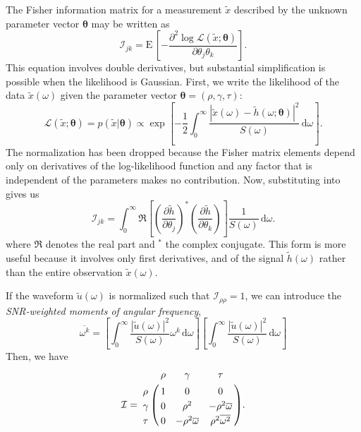 \documentclass{iopart}
\begin{document}
The Fisher information matrix for a measurement $\tilde x$ described by the unknown parameter vector $\boldsymbol{\theta}$ may be written as
%
\begin{equation}\label{eq:general-fisher-matrix}
	\mathcal{I}_{jk} = \mathrm{E} \, \left[
		-\frac{\partial^2 \log
			\mathcal{L}(\tilde x ; \boldsymbol\theta)}
			{\partial \theta_j \theta_k}
	\right].
\end{equation}
%
This equation involves double derivatives, but substantial simplification is possible when the likelihood is Gaussian. First, we write the likelihood of the data $\tilde x (\omega)$ given the parameter vector $\boldsymbol\theta = (\rho, \gamma, \tau)$:
%
\begin{equation}\label{eq:gaussian-likelihood}
	\mathcal{L}(\tilde x; \boldsymbol\theta) = p(\tilde x | \boldsymbol\theta)
		\propto \exp \left[
		- \frac{1}{2} \int_0^\infty \frac{\left|\tilde x (\omega)
			- \tilde h (\omega; \boldsymbol\theta) \right|^2}{S(\omega)} \, \mathrm{d}\omega
	\right].
\end{equation}
%
The normalization has been dropped because the Fisher matrix elements depend only on derivatives of the log\nobreakdashes-likelihood function and any factor that is independent of the parameters makes no contribution. Now, substituting  into  gives us
%
\begin{equation}\label{eq:gaussian-fisher-matrix}
	\mathcal{I}_{jk} = \int_0^\infty \Re \left[
        \left(\frac{\partial \tilde h}{\partial \theta_j}\right)^*
        \left(\frac{\partial \tilde h}{\partial \theta_k}\right)
	\right] \frac{1}{S(\omega)} \, \mathrm{d}\omega.
\end{equation}
%
where $\Re$ denotes the real part and $^*$ the complex conjugate. This form is more useful because it involves only first derivatives, and of the signal $\tilde h (\omega)$ rather than the entire observation $\tilde x (\omega)$.

If the waveform $\tilde u (\omega)$ is normalized such that $\mathcal{I}_{\rho\rho} = 1$, we can introduce the \textit{\ac{SNR}-weighted moments of angular frequency},
%
\begin{equation}\label{eq:angular-frequency-moments}
    \overline{\omega^k} =
        \left[ \int_0^\infty \frac{|\tilde u (\omega)|^2}{S(\omega)} \omega^k \, \mathrm{d}\omega \right]
        \left[ \int_0^\infty \frac{|\tilde u (\omega)|^2}{S(\omega)} \, \mathrm{d}\omega \right]
\end{equation}
%
Then, we have
%
\begin{eqnarray*}
	\mathcal{I} = \bordermatrix{
        ~ & \rho & \gamma & \tau \cr
        \rho & 1 & 0 & 0 \cr
        \gamma & 0 & \rho^2 & -\rho^2 \overline{\omega} \cr
        \tau & 0 & -\rho^2 \overline{\omega} & \rho^2 \overline{\omega^2}
    }.
\end{eqnarray*}
\end{document}
